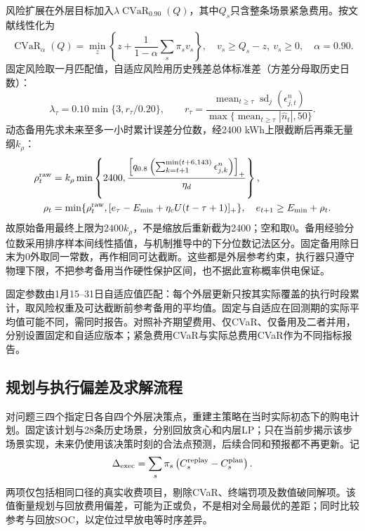 风险扩展在外层目标加入$\lambda\operatorname{CVaR}_{0.90}(Q)$，其中$Q_s$只含整条场景紧急费用。按文献\cite{rockafellar2000}线性化为
\begin{equation}
 \operatorname{CVaR}_{\alpha}(Q)=\min_z\left\{z+\frac{1}{1-\alpha}\sum_s\pi_sv_s\right\},
 \quad v_s\ge Q_s-z,\ v_s\ge0,\quad\alpha=0.90.
 \label{eq:cvar}
\end{equation}
固定风险取一月匹配值，自适应风险用历史残差总体标准差（方差分母取历史日数）：
\begin{equation}
 \lambda_\tau=0.10\min\{3,r_\tau/0.20\},\qquad
 r_\tau=\frac{\operatorname{mean}_{t\ge\tau}\operatorname{sd}_j(\epsilon^n_{j,t})}
 {\max\{\operatorname{mean}_{t\ge\tau}|\widehat n_t|,50\}}.
 \label{eq:risk_weight}
\end{equation}
动态备用先求未来至多一小时累计误差分位数，经2400 kWh上限截断后再乘无量纲$k_\rho$：
\begin{align}
 \rho^{\rm raw}_t&=k_\rho\min\left\{2400,
 \frac{\left[q_{0.8}\left(\sum_{k=t+1}^{\min(t+6,143)}\epsilon^n_{j,k}\right)\right]_+}{\eta_d}\right\},\label{eq:reserve}\\
 \rho_t&=\min\{\rho^{\rm raw}_t,[e_\tau-E_{\min}+\eta_cU(t-\tau+1)]_+\},\quad
 e_{t+1}\ge E_{\min}+\rho_t.\label{eq:reachable_reserve}
\end{align}
故原始备用最终上限为$2400k_\rho$，不是缩放后重新截为2400；空和取0。备用经验分位数采用排序样本间线性插值，与机制推导中的下分位数记法区分。固定备用除日末为0外取同一常数，再作相同可达截断。这些都是外层参考约束，执行器只遵守物理下限，不把参考备用当作硬性保护区间，也不据此宣称概率供电保证。

固定参数由1月15--31日自适应值匹配：每个外层更新只按其实际覆盖的执行时段累计，取风险权重及可达截断前参考备用的平均值。固定与自适应在回测期的实际平均值可能不同，需同时报告。对照补齐期望费用、仅CVaR、仅备用及二者并用，分别设置固定和自适应版本；紧急费用CVaR与实际总费用CVaR作为不同指标报告。

\subsection{规划与执行偏差及求解流程}

对问题三四个指定日各自四个外层决策点，重建主策略在当时实际初态下的购电计划。固定该计划与28条历史场景，分别回放贪心和内层LP；只在当前步揭示该步场景实现，未来仍使用该决策时刻的合法点预测，后续合同和预报都不再更新。记
\begin{equation}
 \Delta_{\rm exec}=\sum_s\pi_s\left(C_s^{\rm replay}-C_s^{\rm plan}\right).
 \label{eq:v2_execution_gap}
\end{equation}
两项仅包括相同口径的真实收费项目，剔除CVaR、终端罚项及数值破同解项。该值衡量规划与回放费用偏差，可能为正或负，不是相对全局最优的差距；同时比较参考与回放SOC，以定位过早放电等时序差异。

